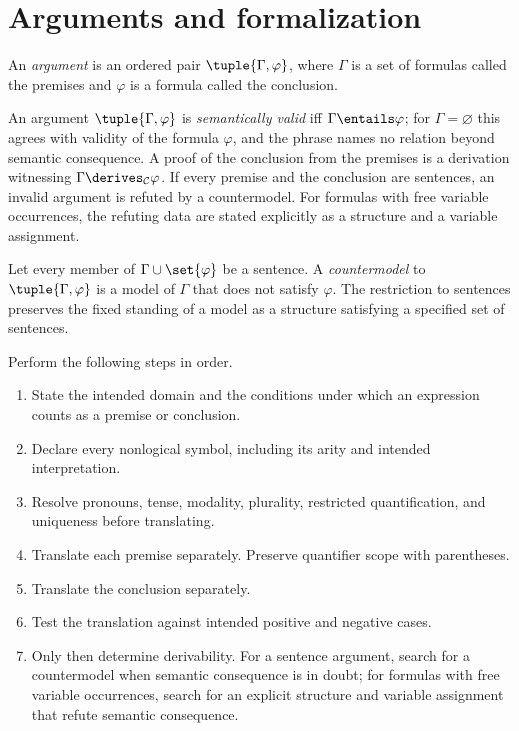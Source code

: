 \section{Arguments and formalization}
\label{sec:levels-05}

\begin{definition}[Argument]
An \emph{argument} is an ordered pair \(\tuple{\Gamma,\varphi}\), where
\(\Gamma\) is a set of formulas called the premises and \(\varphi\) is a
formula called the conclusion.
\end{definition}

An argument \(\tuple{\Gamma,\varphi}\) is \emph{semantically valid} iff
\(\Gamma\entails\varphi\); for \(\Gamma=\varnothing\) this agrees with
validity of the formula \(\varphi\), and the phrase names no relation
beyond semantic consequence.  A proof of
the conclusion from the premises is a derivation witnessing
\(\Gamma\derives_{\mathcal C}\varphi\).  If every premise and the conclusion
are sentences, an invalid argument is refuted by a countermodel.  For formulas
with free variable occurrences, the refuting data are stated explicitly as a
structure and a variable assignment.

\begin{definition}[Countermodel]
Let every member of \(\Gamma\cup\set{\varphi}\) be a sentence.  A
\emph{countermodel} to \(\tuple{\Gamma,\varphi}\) is a model of \(\Gamma\)
that does not satisfy \(\varphi\).
The restriction to sentences preserves the fixed standing of a model as a
structure satisfying a specified set of sentences.
\end{definition}

\begin{method}
Perform the following steps in order.
\begin{enumerate}
  \item State the intended domain and the conditions under which an expression
        counts as a premise or conclusion.
  \item Declare every nonlogical symbol, including its arity and intended
        interpretation.
  \item Resolve pronouns, tense, modality, plurality, restricted quantification,
        and uniqueness before translating.
  \item Translate each premise separately.  Preserve quantifier scope with
        parentheses.
  \item Translate the conclusion separately.
  \item Test the translation against intended positive and negative cases.
  \item Only then determine derivability.  For a sentence argument, search for
        a countermodel when semantic consequence is in doubt; for formulas
        with free variable occurrences, search for an explicit structure and
        variable assignment that refute semantic consequence.
\end{enumerate}
\end{method}

